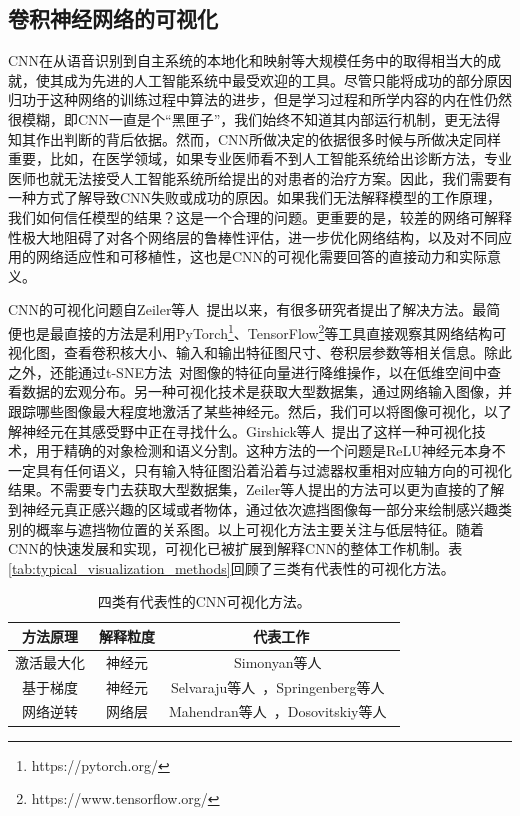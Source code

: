 \subsection{卷积神经网络的可视化}\label{subsec:visulization_methods}
CNN在从语音识别到自主系统的本地化和映射等大规模任务中的取得相当大的成就，使其成为先进的人工智能系统中最受欢迎的工具。尽管只能将成功的部分原因归功于这种网络的训练过程中算法的进步，但是学习过程和所学内容的内在性仍然很模糊，即CNN一直是个“黑匣子”，我们始终不知道其内部运行机制，更无法得知其作出判断的背后依据。然而，CNN所做决定的依据很多时候与所做决定同样重要，比如，在医学领域，如果专业医师看不到人工智能系统给出诊断方法，专业医师也就无法接受人工智能系统所给提出的对患者的治疗方案。因此，我们需要有一种方式了解导致CNN失败或成功的原因。如果我们无法解释模型的工作原理，我们如何信任模型的结果？这是一个合理的问题。更重要的是，较差的网络可解释性极大地阻碍了对各个网络层的鲁棒性评估，进一步优化网络结构，以及对不同应用的网络适应性和可移植性，这也是CNN的可视化需要回答的直接动力和实际意义。

CNN的可视化问题自Zeiler等人~\cite{zeiler2014visualizing}提出以来，有很多研究者提出了解决方法。最简便也是最直接的方法是利用PyTorch\footnote{https://pytorch.org/}、TensorFlow\footnote{https://www.tensorflow.org/}等工具直接观察其网络结构可视化图，查看卷积核大小、输入和输出特征图尺寸、卷积层参数等相关信息。除此之外，还能通过t-SNE方法~\cite{maaten2008visualizing}对图像的特征向量进行降维操作，以在低维空间中查看数据的宏观分布。另一种可视化技术是获取大型数据集，通过网络输入图像，并跟踪哪些图像最大程度地激活了某些神经元。然后，我们可以将图像可视化，以了解神经元在其感受野中正在寻找什么。Girshick等人~\cite{girshick2014rich}提出了这样一种可视化技术，用于精确的对象检测和语义分割。这种方法的一个问题是ReLU神经元本身不一定具有任何语义，只有输入特征图沿着沿着与过滤器权重相对应轴方向的可视化结果。不需要专门去获取大型数据集，Zeiler等人提出的方法可以更为直接的了解到神经元真正感兴趣的区域或者物体，通过依次遮挡图像每一部分来绘制感兴趣类别的概率与遮挡物位置的关系图。以上可视化方法主要关注与低层特征。随着CNN的快速发展和实现，可视化已被扩展到解释CNN的整体工作机制。表\ref{tab:typical_visualization_methods}回顾了三类有代表性的可视化方法。
\begin{table}[h]
	\centering
	\caption{四类有代表性的CNN可视化方法。}		
	\label{tab:typical_visualization_methods}
	\begin{tabular}{c|c|c}
		\toprule[2pt]
		方法原理 & 解释粒度 & 代表工作 \\ \midrule[2pt]
		激活最大化 & 神经元  & Simonyan等人~\cite{simonyan2013deep}  \\\hline
		基于梯度 &  神经元 & Selvaraju等人~\cite{selvaraju2017grad}，Springenberg等人~\cite{springenberg2014striving} \\  \hline
		网络逆转 & 网络层 &Mahendran等人~\cite{mahendran2015understanding, mahendran2016visualizing}，Dosovitskiy等人~\cite{dosovitskiy2016inverting}\\
		\bottomrule[2pt]
	\end{tabular}
	\label{tab:four_visulization_types}
\end{table}
